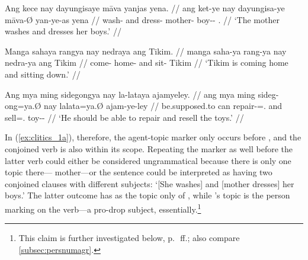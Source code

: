 \pex
\a\label{ex:clitics_1a}\begingl
	\gla Ang kece nay dayungisaye māva yanjas yena. //
	\glb ang ket-ye nay dayungisa-ye māva-Ø yan-ye-as yena //
	\glc \AgtT{} wash-\TsgF{} and dress-\TsgF{} mother-\Top{} boy-\Pl{}-\Parg{}
		\TsgF{}.\Gen{} //
	\glft `The mother washes and dresses her boys.' //
\endgl

\a\label{ex:clitics_1b}\begingl
	\gla Manga sahaya rangya nay nedraya ang Tikim. //
	\glb manga saha-ya rang-ya nay nedra-ya ang Tikim //
	\glc \Prog{} come-\TsgM{} home-\Loc{} and sit-\TsgM{} \Aarg{} Tikim //
	\glft `Tikim is coming home and sitting down.' //
\endgl

\a\label{ex:clitics_1c}\begingl
	\gla Ang mya ming sidegongya nay la-lataya ajamyeley. //
	\glb ang mya ming sideg-ong=ya.Ø nay la\til{}lata=ya.Ø ajam-ye-ley //
	\glc \AgtT{} be.supposed.to can repair-\Irr{}=\TsgM{}.\Top{} and
		\Iter{}\til{}sell=\TsgM{}.\Top{} toy-\Pl{}-\PargI{} //
	\glft `He should be able to repair and resell the toys.' //
\endgl
\xe

\label{clitics_preverb_top}
In (\ref{ex:clitics_1a}), therefore, the agent-topic  marker
 only occurs before , and the
conjoined verb  is also within its
scope. Repeating the marker as well before the latter verb could either be
considered ungrammatical because there is only one topic
there--- {mother}---or the sentence could be interpreted as
having two conjoined clauses with different subjects: `[She washes] and [mother
dresses] her boys.' The latter outcome has  as the topic only
of , while 's topic is the person
marking on the verb---a pro-drop subject, essentially.\footnote{This claim is
further investigated below, p.~\pageref{subsubsec:suffixes}\,ff.; also compare
\autoref{subsec:persnumagr}.}

